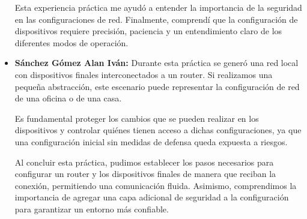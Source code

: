 \documentclass[a4paper,11pt]{article}
\begin{document}
\begin{itemize}
          Esta experiencia práctica me ayudó a entender la importancia de la seguridad en
          las configuraciones de red. Finalmente, comprendí que la configuración de
          dispositivos requiere precisión, paciencia y un entendimiento claro de los
          diferentes modos de operación.

    \item \textbf{Sánchez Gómez Alan Iván:}
          Durante esta práctica se generó una red local con dispositivos finales interconectados a un router. Si realizamos una pequeña abstracción, este escenario puede representar la configuración de red de una oficina o de una casa.

          Es fundamental proteger los cambios que se pueden realizar en los dispositivos
          y controlar quiénes tienen acceso a dichas configuraciones, ya que una
          configuración inicial sin medidas de defensa queda expuesta a riesgos.

          Al concluir esta práctica, pudimos establecer los pasos necesarios para
          configurar un router y los dispositivos finales de manera que reciban la
          conexión, permitiendo una comunicación fluida. Asimismo, comprendimos la
          importancia de agregar una capa adicional de seguridad a la configuración para
          garantizar un entorno más confiable.
\end{itemize}
\end{document}

